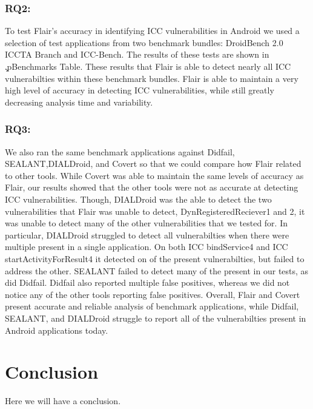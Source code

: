 \documentclass[twocolumn]{article}
\begin{document}
	\subsubsection{RQ2:}
		To test Flair's accuracy in identifying ICC vulnerabilities in Android we used a selection of test applications from two benchmark bundles: DroidBench 2.0 ICCTA Branch and ICC-Bench. The results of these tests are shown in \c.p{Benchmarks Table}. These results that Flair is able to detect nearly all ICC vulnerabilties within these benchmark bundles. Flair is able to maintain a very high level of accuracy in detecting ICC vulnerabilities, while still greatly decreasing analysis time and variability. 
		
	\subsubsection{RQ3:}
		We also ran the same benchmark applications against Didfail, SEALANT,DIALDroid, and Covert so that we could compare how Flair related to other tools. While Covert was able to maintain the same levels of accuracy as Flair, our results showed that the other tools were not as accurate at detecting ICC vulnerabilities. Though, DIALDroid was the able to detect the two vulnerabilities that Flair was unable to detect, DynRegisteredReciever1 and 2, it was unable to detect many of the other vulnerabilities that we tested for. In particular, DIALDroid struggled to detect all vulnerabilties when there were multiple present in a single application. On both ICC bindService4 and ICC startActivityForResult4 it detected on of the present vulnerabilties, but failed to address the other. SEALANT failed to detect many of the present in our tests, as did Didfail. Didfail also reported multiple false positives, whereas we did not notice any of the other tools reporting false positives. Overall, Flair and Covert present accurate and reliable analysis of benchmark applications, while Didfail, SEALANT, and DIALDroid struggle to report all of the vulnerabilties present in Android applications today.

\section[3]{Conclusion}
Here we will have a conclusion.
\end{document}
